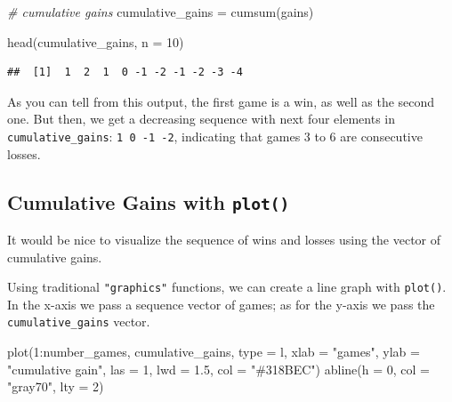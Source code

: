\documentclass[
]{book}
\newenvironment{Shaded}{\begin{snugshade}}{\end{snugshade}}
\newcommand{\AttributeTok}[1]{\textcolor[rgb]{0.77,0.63,0.00}{#1}}
\newcommand{\CommentTok}[1]{\textcolor[rgb]{0.56,0.35,0.01}{\textit{#1}}}
\newcommand{\DecValTok}[1]{\textcolor[rgb]{0.00,0.00,0.81}{#1}}
\newcommand{\FloatTok}[1]{\textcolor[rgb]{0.00,0.00,0.81}{#1}}
\newcommand{\FunctionTok}[1]{\textcolor[rgb]{0.00,0.00,0.00}{#1}}
\newcommand{\NormalTok}[1]{#1}
\newcommand{\OtherTok}[1]{\textcolor[rgb]{0.56,0.35,0.01}{#1}}
\newcommand{\SpecialCharTok}[1]{\textcolor[rgb]{0.00,0.00,0.00}{#1}}
\newcommand{\StringTok}[1]{\textcolor[rgb]{0.31,0.60,0.02}{#1}}
\begin{document}
\begin{Shaded}
\begin{Highlighting}[]
\CommentTok{\# cumulative gains}
\NormalTok{cumulative\_gains }\OtherTok{=} \FunctionTok{cumsum}\NormalTok{(gains)}

\FunctionTok{head}\NormalTok{(cumulative\_gains, }\AttributeTok{n =} \DecValTok{10}\NormalTok{)}
\end{Highlighting}
\end{Shaded}

\begin{verbatim}
##  [1]  1  2  1  0 -1 -2 -1 -2 -3 -4
\end{verbatim}

As you can tell from this output, the first game is a win, as well as the
second one. But then, we get a decreasing sequence with next four elements
in \texttt{cumulative\_gains}: \texttt{1\ 0\ -1\ -2}, indicating that games 3 to 6 are
consecutive losses.

\hypertarget{cumulative-gains-with-plot}{%
\subsection{\texorpdfstring{Cumulative Gains with \texttt{plot()}}{Cumulative Gains with plot()}}\label{cumulative-gains-with-plot}}

It would be nice to visualize the sequence of wins and losses using the
vector of cumulative gains.

Using traditional \texttt{"graphics"} functions, we can create a line graph with
\texttt{plot()}. In the x-axis we pass a sequence vector of games; as for the y-axis
we pass the \texttt{cumulative\_gains} vector.

\begin{Shaded}
\begin{Highlighting}[]
\FunctionTok{plot}\NormalTok{(}\DecValTok{1}\SpecialCharTok{:}\NormalTok{number\_games, cumulative\_gains, }\AttributeTok{type =} \StringTok{\textquotesingle{}l\textquotesingle{}}\NormalTok{,}
     \AttributeTok{xlab =} \StringTok{"games"}\NormalTok{, }\AttributeTok{ylab =} \StringTok{"cumulative gain"}\NormalTok{, }\AttributeTok{las =} \DecValTok{1}\NormalTok{,}
     \AttributeTok{lwd =} \FloatTok{1.5}\NormalTok{, }\AttributeTok{col =} \StringTok{"\#318BEC"}\NormalTok{)}
\FunctionTok{abline}\NormalTok{(}\AttributeTok{h =} \DecValTok{0}\NormalTok{, }\AttributeTok{col =} \StringTok{"gray70"}\NormalTok{, }\AttributeTok{lty =} \DecValTok{2}\NormalTok{)}
\end{Highlighting}
\end{Shaded}
\end{document}
